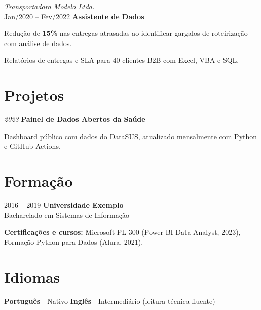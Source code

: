         \begin{twocolentry}{
            \textit{Transportadora Modelo Ltda.} \\
            Jan/2020 -- Fev/2022
        }
            \textbf{Assistente de Dados}
        \end{twocolentry}
        \vspace{0.10cm}
        \begin{onecolentry}
            \begin{highlights}
                \item Redução de \textbf{15\%} nas entregas atrasadas ao identificar gargalos de roteirização com análise de dados.
                \item Relatórios de entregas e SLA para 40 clientes B2B com Excel, VBA e SQL.
            \end{highlights}
        \end{onecolentry}

    \section{Projetos}
        \begin{twocolentry}{
            \textit{2023}
        }
            \textbf{Painel de Dados Abertos da Saúde}
        \end{twocolentry}
        \vspace{0.10cm}
        \begin{onecolentry}
            \begin{highlights}
                \item Dashboard público com dados do DataSUS, atualizado mensalmente com Python e GitHub Actions.
            \end{highlights}
        \end{onecolentry}

    \section{Formação}
        \begin{twocolentry}{2016 -- 2019}
            \textbf{Universidade Exemplo} \\
            Bacharelado em Sistemas de Informação
        \end{twocolentry}

        \vspace{0.12cm}

        \begin{onecolentry}
            \textbf{Certificações e cursos:} Microsoft PL-300 (Power BI Data Analyst, 2023), Formação Python para Dados (Alura, 2021).
        \end{onecolentry}

    \section{Idiomas}
        \begin{onecolentry}
            \textbf{Português} - Nativo \quad\textbar\quad \textbf{Inglês} - Intermediário (leitura técnica fluente)
        \end{onecolentry}

